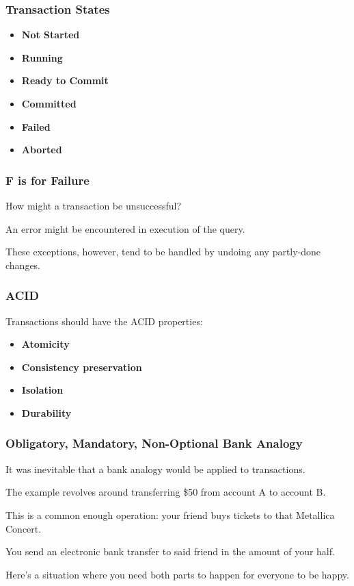\begin{frame}
\frametitle{Transaction States}
\begin{itemize}
\item \textbf{Not Started}
\item \textbf{Running}
\item \textbf{Ready to Commit}
\item \textbf{Committed}
\item \textbf{Failed}
\item \textbf{Aborted}
\end{itemize}

\end{frame}

\begin{frame}
\frametitle{F is for Failure}

How might a transaction be unsuccessful? 

An error might be encountered in execution of the query.

These exceptions, however, tend to be handled by undoing any partly-done changes.

\end{frame}

\begin{frame}
\frametitle{ACID}
Transactions should have the \alert{ACID} properties:
\begin{itemize}
	\item \textbf{Atomicity}
	\item \textbf{Consistency preservation}
	\item \textbf{Isolation}
	\item \textbf{Durability}
\end{itemize}
\end{frame}


\begin{frame}
\frametitle{Obligatory, Mandatory, Non-Optional Bank Analogy}

It was inevitable that a bank analogy would be applied to transactions. 

The example revolves around transferring \$50 from account A to account B. 

This is a common enough operation: your friend buys tickets to that Metallica Concert.

You send an electronic bank transfer to said friend in the amount of your half.  

Here's a situation where you need both parts to happen for everyone to be happy. 

\end{frame}

